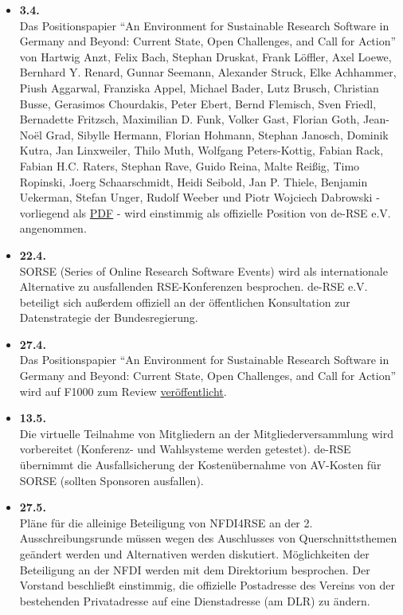 \begin{itemize}
 \item \textbf{3.4.}\\Das Positionspapier "`An Environment for Sustainable Research Software in Germany and Beyond: Current State, Open Challenges, and Call for Action"' von Hartwig Anzt, Felix Bach, Stephan Druskat, Frank Löffler, Axel Loewe, Bernhard Y. Renard, Gunnar Seemann, Alexander Struck, Elke Achhammer, Piush Aggarwal, Franziska Appel, Michael Bader, Lutz Brusch, Christian Busse, Gerasimos Chourdakis, Peter Ebert, Bernd Flemisch, Sven Friedl, Bernadette Fritzsch, Maximilian D. Funk, Volker Gast, Florian Goth, Jean-Noël Grad, Sibylle Hermann, Florian Hohmann, Stephan Janosch, Dominik Kutra, Jan Linxweiler, Thilo Muth, Wolfgang Peters-Kottig, Fabian Rack, Fabian H.C. Raters, Stephan Rave, Guido Reina, Malte Reißig, Timo Ropinski, Joerg Schaarschmidt, Heidi Seibold, Jan P. Thiele, Benjamin Uekerman, Stefan Unger, Rudolf Weeber und Piotr Wojciech Dabrowski - vorliegend als \href{https://github.com/DE-RSE/positions/blob/8304df05448f22ae4293bb06ad513bc69a4ccc00/001/manuscript.pdf}{PDF} - wird einstimmig als offizielle Position von de-RSE e.V. angenommen.
 \item \textbf{22.4.}\\SORSE (Series of Online Research Software Events) wird als internationale Alternative zu ausfallenden RSE-Konferenzen besprochen.
 de-RSE e.V. beteiligt sich außerdem offiziell an der öffentlichen Konsultation zur Datenstrategie der Bundesregierung.
 \item \textbf{27.4.}\\Das Positionspapier "`An Environment for Sustainable Research Software in Germany and Beyond: Current State, Open Challenges, and Call for Action"' wird auf F1000 zum Review \href{https://f1000research.com/articles/9-295/v1}{veröffentlicht}.
 \item \textbf{13.5.}\\Die virtuelle Teilnahme von Mitgliedern an der Mitgliederversammlung wird vorbereitet (Konferenz- und Wahlsysteme werden getestet). de-RSE übernimmt die Ausfallsicherung der Kostenübernahme von AV-Kosten für SORSE (sollten Sponsoren ausfallen).
 \item \textbf{27.5.}\\Pläne für die alleinige Beteiligung von NFDI4RSE an der 2. Ausschreibungsrunde müssen wegen des Auschlusses von Querschnittsthemen geändert werden und Alternativen werden diskutiert. Möglichkeiten der Beteiligung an der NFDI werden mit dem Direktorium besprochen. Der Vorstand beschließt einstimmig, die offizielle Postadresse des Vereins von der bestehenden Privatadresse auf eine Dienstadresse (am DLR) zu ändern.

\end{itemize}
